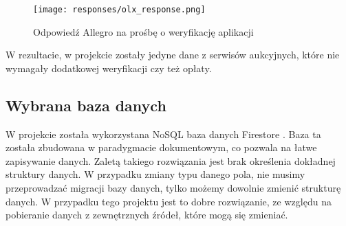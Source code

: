 \begin{figure}[H]
    \centering
    \texttt{[image: responses/olx\_response.png]}
    \caption{Odpowiedź Allegro na prośbę o weryfikację aplikacji}
    \label{olx_response}
\end{figure}

W rezultacie, w projekcie zostały jedyne dane z serwisów aukcyjnych, które nie wymagały dodatkowej weryfikacji czy też opłaty.

\subsection{Wybrana baza danych}
W projekcie została wykorzystana NoSQL \cite{NoSQL} baza danych Firestore \cite{firestore}. Baza ta została zbudowana w paradygmacie dokumentowym, co pozwala na łatwe zapisywanie danych. Zaletą takiego rozwiązania jest brak określenia dokładnej struktury danych. W przypadku zmiany typu danego pola, nie musimy przeprowadzać migracji bazy danych, tylko możemy dowolnie zmienić strukturę danych. W przypadku tego projektu jest to dobre rozwiązanie, ze względu na pobieranie danych z zewnętrznych źródeł, które mogą się zmieniać.

